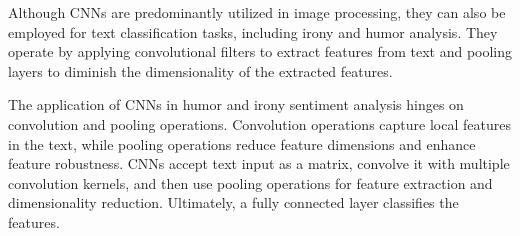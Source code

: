 \documentclass[a4paper]{article}
\begin{document}
Although CNNs are predominantly utilized in image processing, they can also be employed for text classification tasks, including irony and humor analysis. They operate by applying convolutional filters to extract features from text and pooling layers to diminish the dimensionality of the extracted features.

The application of CNNs in humor and irony sentiment analysis hinges on convolution and pooling operations. Convolution operations capture local features in the text, while pooling operations reduce feature dimensions and enhance feature robustness. CNNs accept text input as a matrix, convolve it with multiple convolution kernels, and then use pooling operations for feature extraction and dimensionality reduction. Ultimately, a fully connected layer classifies the features.
\end{document}

